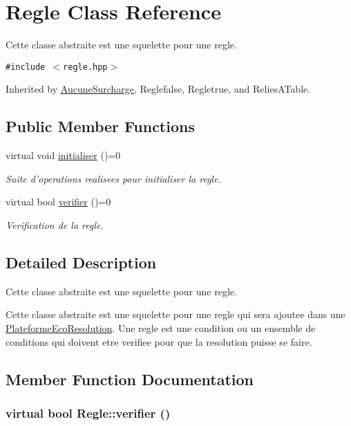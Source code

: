 \hypertarget{classRegle}{
\section{Regle Class Reference}
\label{classRegle}
}
Cette classe abstraite est une squelette pour une regle.  


{\tt \#include $<$regle.hpp$>$}

Inherited by \hyperlink{classAucuneSurcharge}{AucuneSurcharge}, Reglefalse, Regletrue, and ReliesATable.

\subsection*{Public Member Functions}
\begin{CompactItemize}
\item 
\hypertarget{classRegle_b9a0850b2a83f2f0a8deaac82c4500c0}{
virtual void \hyperlink{classRegle_b9a0850b2a83f2f0a8deaac82c4500c0}{initialiser} ()=0}
\label{classRegle_b9a0850b2a83f2f0a8deaac82c4500c0}

\begin{CompactList}\small\item\em Suite d'operations realisees pour initialiser la regle. \item\end{CompactList}\item 
virtual bool \hyperlink{classRegle_4b3de9a64ec0e948e9177026afcc073d}{verifier} ()=0
\begin{CompactList}\small\item\em Verification de la regle. \item\end{CompactList}\end{CompactItemize}


\subsection{Detailed Description}
Cette classe abstraite est une squelette pour une regle. 

Cette classe abstraite est une squelette pour une regle qui sera ajoutee dans une \hyperlink{classPlateformeEcoResolution}{PlateformeEcoResolution}. Une regle est une condition ou un ensemble de conditions qui doivent etre verifiee pour que la resolution puisse se faire. 

\subsection{Member Function Documentation}
\hypertarget{classRegle_4b3de9a64ec0e948e9177026afcc073d}{
\subsubsection[{verifier}]{\setlength{\rightskip}{0pt plus 5cm}virtual bool Regle::verifier ()}}
\label{classRegle_4b3de9a64ec0e948e9177026afcc073d}


